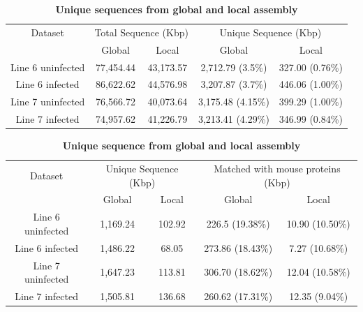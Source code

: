 \documentclass[10pt]{article}
\begin{document}
\begin{table}[!ht]
\caption{
\bf{Unique sequences from global and local assembly}}
\begin{tabular}{ccccc}
\hline
Dataset & \multicolumn{2}{c}{Total Sequence (Kbp)} & \multicolumn{2}{c}{Unique Sequence (Kbp)}\\
 & Global & Local & Global & Local\\
\hline
Line 6 uninfected & 77,454.44 & 43,173.57 & 2,712.79 (3.5\%) & 327.00 (0.76\%)\\
Line 6 infected & 86,622.62 & 44,576.98 & 3,207.87 (3.7\%) & 446.06 (1.00\%)\\
Line 7 uninfected & 76,566.72 & 40,073.64 & 3,175.48 (4.15\%) & 399.29 (1.00\%)\\
Line 7 infected & 74,957.62 & 41,226.79 & 3,213.41 (4.29\%) & 346.99 (0.84\%)\\
\hline
\end{tabular}
\label{unique_sequences}
\end{table}

\begin{table}[!ht]
\caption{
\bf{Unique sequence from global and local assembly}}
\begin{tabular}{ccccc}
\hline
Dataset & \multicolumn{2}{c}{Unique Sequence (Kbp)} & \multicolumn{2}{c}{Matched with mouse proteins (Kbp)}\\
 & Global & Local & Global & Local\\
\hline
Line 6 uninfected & 1,169.24 & 102.92 & 226.5 (19.38\%) & 10.90 (10.50\%)\\
Line 6 infected & 1,486.22 & 68.05 & 273.86 (18.43\%)& 7.27 (10.68\%)\\
Line 7 uninfected & 1,647.23 & 113.81 & 306.70 (18.62\%) & 12.04 (10.58\%)\\
Line 7 infected & 1,505.81 & 136.68 & 260.62 (17.31\%)& 12.35 (9.04\%)\\
\hline
\end{tabular}
\label{unique_sequences_matched_mouse}
\end{table}
\end{document}
